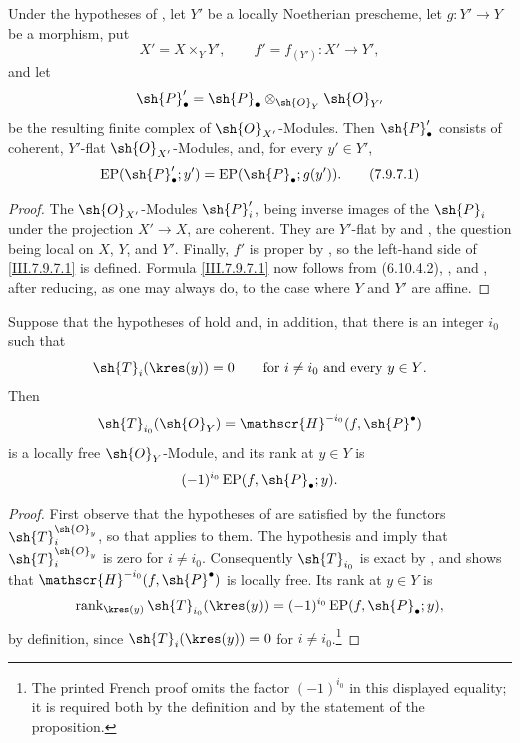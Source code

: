 \begin{proposition}[7.9.7]
\label{III.7.9.7}
Under the hypotheses of , let $Y'$ be a
locally Noetherian prescheme, let $g:Y'\to Y$ be a
morphism, put
\[
  X'=X\times_Y Y',\qquad
  f'=f_{(Y')}:X'\longrightarrow Y',
\]
and let
\[
  \sh{P}'_\bullet
  =
  \sh{P}_\bullet\otimes_{\sh{O}_Y}\sh{O}_{Y'}
\]
be the resulting finite complex of $\sh{O}_{X'}$-Modules.
Then $\sh{P}'_\bullet$ consists of coherent,
$Y'$-flat $\sh{O}_{X'}$-Modules, and, for every
$y'\in Y'$,
\[
  \operatorname{EP}(\sh{P}'_\bullet;y')
  =
  \operatorname{EP}(\sh{P}_\bullet;g(y')).
  \tag{7.9.7.1}\label{III.7.9.7.1}
\]
\end{proposition}

\begin{proof}
The $\sh{O}_{X'}$-Modules $\sh{P}'_i$, being inverse images
of the $\sh{P}_i$ under the projection $X'\to X$, are
coherent.  They are $Y'$-flat by  and
, the question being local on $X$, $Y$,
and $Y'$.  Finally, $f'$ is proper by
, so the left-hand side of
\eqref{III.7.9.7.1} is defined.  Formula
\eqref{III.7.9.7.1} now follows from
\textup{(6.10.4.2)}, , and
, after reducing, as one may always do, to
the case where $Y$ and $Y'$ are affine.
\end{proof}

\begin{proposition}[7.9.8]
\label{III.7.9.8}
Suppose that the hypotheses of  hold and,
in addition, that there is an integer $i_0$ such that
\[
  \sh{T}_i(\kres(y))=0
  \qquad\text{for $i\neq i_0$ and every $y\in Y$.}
\]
Then
\[
  \sh{T}_{i_0}(\sh{O}_Y)
  =
  \mathscr{H}^{-i_0}(f,\sh{P}^\bullet)
\]
is a locally free $\sh{O}_Y$-Module, and its rank at
$y\in Y$ is
\[
  (-1)^{i_0}\operatorname{EP}(f,\sh{P}_\bullet;y).
\]
\end{proposition}

\begin{proof}
First observe that the hypotheses of  are
satisfied by the functors $\sh{T}^{\sh{O}_y}_i$, so that
 applies to them.  The hypothesis and
 imply that
$\sh{T}^{\sh{O}_y}_i$ is zero for $i\neq i_0$.
Consequently $\sh{T}_{i_0}$ is exact by
, and  shows that
$\mathscr{H}^{-i_0}(f,\sh{P}^\bullet)$ is locally free.
Its rank at $y\in Y$ is
\[
  \operatorname{rank}_{\kres(y)}
    \sh{T}_{i_0}(\kres(y))
  =
  (-1)^{i_0}\operatorname{EP}(f,\sh{P}_\bullet;y),
\]
by definition, since $\sh{T}_i(\kres(y))=0$ for
$i\neq i_0$.\footnote{The printed French proof omits the
factor $(-1)^{i_0}$ in this displayed equality; it is
required both by the definition and by the statement of
the proposition.}
\end{proof}


